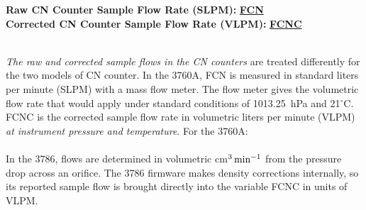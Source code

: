 \begin{hangparagraphs}
\textbf{}%
\noindent\begin{minipage}[t]{1\columnwidth}%
\textbf{Raw CN Counter Sample Flow Rate (SLPM):}\hypertarget{FCN}{}\textbf{
}\textbf{\uline{FCN}}\\
\textbf{Corrected CN Counter Sample Flow Rate (VLPM):}\hypertarget{FCNC}{}\textbf{
}\textbf{\uline{FCNC}}\textbf{\uline{}}%
\end{minipage}\\
\emph{The raw and corrected sample flows in the CN counters} are treated
differently for the two models of CN counter. In the 3760A, FCN is
measured in standard liters per minute (SLPM) with a mass flow meter.
The flow meter gives the volumetric flow rate that would apply under
standard conditions of 1013.25~hPa and 21$^{\circ}$C.
FCNC is the corrected sample flow rate in volumetric liters per minute
(VLPM) \emph{at instrument pressure and temperature}. For the 3760A:\\
\\
In the 3786, flows are determined in volumetric cm$^{3}\thinspace\mathrm{min}^{-1}$
from the pressure drop across an orifice. The 3786 firmware makes
density corrections internally, so its reported sample flow is brought
directly into the variable FCNC in units of VLPM.\\
\vfill\eject


\end{hangparagraphs}

